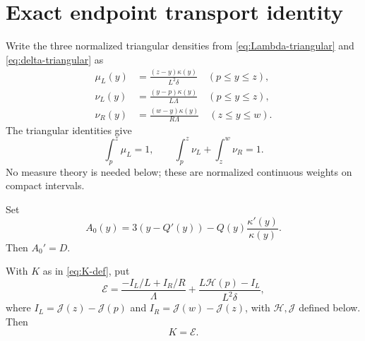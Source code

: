 \section{Exact endpoint transport identity}\label{sec:transport}

Write the three normalized triangular densities from
\eqref{eq:Lambda-triangular} and \eqref{eq:delta-triangular} as
\begin{align}
 \mu_L(y)&=\frac{(z-y)\kappa(y)}{L^2\delta}
 \quad(p\leq y\leq z),\label{eq:mu}\\
 \nu_L(y)&=\frac{(y-p)\kappa(y)}{L\Lambda}
 \quad(p\leq y\leq z),\nonumber\\
 \nu_R(y)&=\frac{(w-y)\kappa(y)}{R\Lambda}
 \quad(z\leq y\leq w).\label{eq:nu}
\end{align}
The triangular identities give
\begin{equation}\label{eq:density-masses}
 \int_p^z\mu_L=1,\qquad
 \int_p^z\nu_L+\int_z^w\nu_R=1.
\end{equation}
No measure theory is needed below; these are normalized continuous weights on
compact intervals.

Set
\[
 A_0(y)=3(y-Q'(y))-Q(y)\frac{\kappa'(y)}{\kappa(y)}.
\]
Then \(A_0'=D\).

\begin{lemma}\label{lem:transport}
With \(K\) as in \eqref{eq:K-def}, put
\begin{equation}\label{eq:transport-endpoint}
 \mathcal E=
 \frac{-I_L/L+I_R/R}{\Lambda}
 +\frac{L\mathcal H(p)-I_L}{L^2\delta},
\end{equation}
where \(I_L=\mathcal J(z)-\mathcal J(p)\) and
\(I_R=\mathcal J(w)-\mathcal J(z)\), with \(\mathcal H,\mathcal J\) defined
below. Then
\begin{equation}\label{eq:transport-expectation}
 K=\mathcal E.
\end{equation}
\end{lemma}

